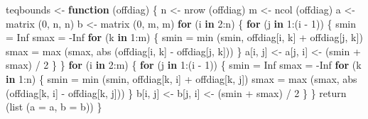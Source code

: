 \documentclass[
  12pt,
  letterpaper,
  DIV=11,
  numbers=noendperiod]{scrreprt}
\newenvironment{Shaded}{\begin{snugshade}}{\end{snugshade}}
\newcommand{\AttributeTok}[1]{\textcolor[rgb]{0.40,0.45,0.13}{#1}}
\newcommand{\ConstantTok}[1]{\textcolor[rgb]{0.56,0.35,0.01}{#1}}
\newcommand{\ControlFlowTok}[1]{\textcolor[rgb]{0.00,0.23,0.31}{\textbf{#1}}}
\newcommand{\DecValTok}[1]{\textcolor[rgb]{0.68,0.00,0.00}{#1}}
\newcommand{\FunctionTok}[1]{\textcolor[rgb]{0.28,0.35,0.67}{#1}}
\newcommand{\NormalTok}[1]{\textcolor[rgb]{0.00,0.23,0.31}{#1}}
\newcommand{\OtherTok}[1]{\textcolor[rgb]{0.00,0.23,0.31}{#1}}
\newcommand{\SpecialCharTok}[1]{\textcolor[rgb]{0.37,0.37,0.37}{#1}}
\theoremstyle{remark}
\begin{document}
\begin{Shaded}
\begin{Highlighting}[]
\NormalTok{teqbounds }\OtherTok{\textless{}{-}} \ControlFlowTok{function}\NormalTok{ (offdiag) \{}
\NormalTok{  n }\OtherTok{\textless{}{-}} \FunctionTok{nrow}\NormalTok{ (offdiag)}
\NormalTok{  m }\OtherTok{\textless{}{-}} \FunctionTok{ncol}\NormalTok{ (offdiag)}
\NormalTok{  a }\OtherTok{\textless{}{-}} \FunctionTok{matrix}\NormalTok{ (}\DecValTok{0}\NormalTok{, n, n)}
\NormalTok{  b }\OtherTok{\textless{}{-}} \FunctionTok{matrix}\NormalTok{ (}\DecValTok{0}\NormalTok{, m, m)}
  \ControlFlowTok{for}\NormalTok{ (i }\ControlFlowTok{in} \DecValTok{2}\SpecialCharTok{:}\NormalTok{n) \{}
    \ControlFlowTok{for}\NormalTok{ (j }\ControlFlowTok{in} \DecValTok{1}\SpecialCharTok{:}\NormalTok{(i }\SpecialCharTok{{-}} \DecValTok{1}\NormalTok{)) \{}
\NormalTok{      smin }\OtherTok{=} \ConstantTok{Inf}
\NormalTok{      smax }\OtherTok{=} \SpecialCharTok{{-}}\ConstantTok{Inf}
      \ControlFlowTok{for}\NormalTok{ (k }\ControlFlowTok{in} \DecValTok{1}\SpecialCharTok{:}\NormalTok{m) \{}
\NormalTok{        smin }\OtherTok{=} \FunctionTok{min}\NormalTok{ (smin, offdiag[i, k] }\SpecialCharTok{+}\NormalTok{ offdiag[j, k])}
\NormalTok{        smax }\OtherTok{=} \FunctionTok{max}\NormalTok{ (smax, }\FunctionTok{abs}\NormalTok{ (offdiag[i, k] }\SpecialCharTok{{-}}\NormalTok{ offdiag[j, k]))}
\NormalTok{      \}}
\NormalTok{      a[i, j] }\OtherTok{\textless{}{-}}\NormalTok{ a[j, i] }\OtherTok{\textless{}{-}}\NormalTok{ (smin }\SpecialCharTok{+}\NormalTok{ smax) }\SpecialCharTok{/} \DecValTok{2}
\NormalTok{    \}}
\NormalTok{  \}}
  \ControlFlowTok{for}\NormalTok{ (i }\ControlFlowTok{in} \DecValTok{2}\SpecialCharTok{:}\NormalTok{m) \{}
    \ControlFlowTok{for}\NormalTok{ (j }\ControlFlowTok{in} \DecValTok{1}\SpecialCharTok{:}\NormalTok{(i }\SpecialCharTok{{-}} \DecValTok{1}\NormalTok{)) \{}
\NormalTok{      smin }\OtherTok{=} \ConstantTok{Inf}
\NormalTok{      smax }\OtherTok{=} \SpecialCharTok{{-}}\ConstantTok{Inf}
      \ControlFlowTok{for}\NormalTok{ (k }\ControlFlowTok{in} \DecValTok{1}\SpecialCharTok{:}\NormalTok{n) \{}
\NormalTok{        smin }\OtherTok{=} \FunctionTok{min}\NormalTok{ (smin, offdiag[k, i] }\SpecialCharTok{+}\NormalTok{ offdiag[k, j])}
\NormalTok{        smax }\OtherTok{=} \FunctionTok{max}\NormalTok{ (smax, }\FunctionTok{abs}\NormalTok{ (offdiag[k, i] }\SpecialCharTok{{-}}\NormalTok{ offdiag[k, j]))}
\NormalTok{      \}}
\NormalTok{      b[i, j] }\OtherTok{\textless{}{-}}\NormalTok{ b[j, i] }\OtherTok{\textless{}{-}}\NormalTok{ (smin }\SpecialCharTok{+}\NormalTok{ smax) }\SpecialCharTok{/} \DecValTok{2}
\NormalTok{    \}}
\NormalTok{  \}}
  \FunctionTok{return}\NormalTok{ (}\FunctionTok{list}\NormalTok{ (}\AttributeTok{a =}\NormalTok{ a, }\AttributeTok{b =}\NormalTok{ b))}
\NormalTok{\}}
\end{Highlighting}
\end{Shaded}
\end{document}
